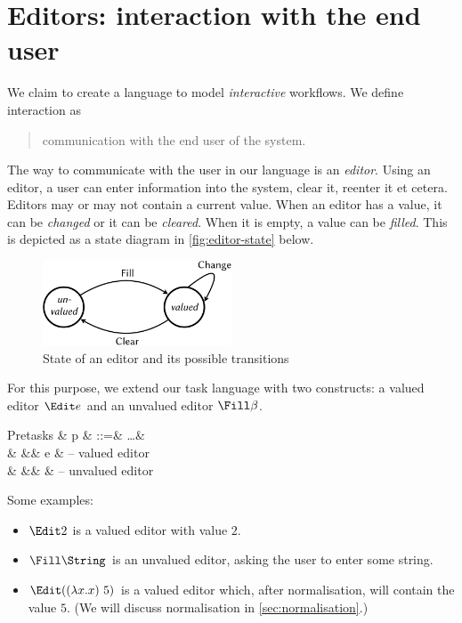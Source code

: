 
\section{Editors: interaction with the end user}

We claim to create a language to model \emph{interactive} workflows.
We define interaction as
\begin{quote}
  communication with the end user of the system.
\end{quote}
The way to communicate with the user in our language is an \emph{editor}.
Using an editor,
a user can enter information into the system,
clear it, reenter it et cetera.
Editors may or may not contain a current value.
When an editor has a value, it can be \emph{changed} or it can be \emph{cleared}.
When it is empty, a value can be \emph{filled}.
This is depicted as a state diagram in \autoref{fig:editor-state} below.

\begin{figure}
  \centering
  \includegraphics[width=0.5\textwidth]{figures/editor-state-crop.pdf}
  \caption{State of an editor and its possible transitions}
  \label{fig:editor-state}
\end{figure}

For this purpose, we extend our task language with two constructs:
a valued editor $\Edit e$ and an unvalued editor $\Fill \beta$.
\begin{grammar}
  Pretasks
    & p & ::=& \ldots      & \\
    &   &\mid& \Edit e     & – valued editor \\
    &   &\mid& \Fill \tau  & – unvalued editor \\
\end{grammar}
Some examples:
\begin{itemize}
  \item $\Edit 2$ is a valued editor with value $2$.
  \item $\Fill \String$ is an unvalued editor,
    asking the user to enter some string.
  \item $\Edit ((\lambda x . x)\ 5)$ is a valued editor which,
    after normalisation, will contain the value $5$.
    (We will discuss normalisation in \autoref{sec:normalisation}.)
\end{itemize}

